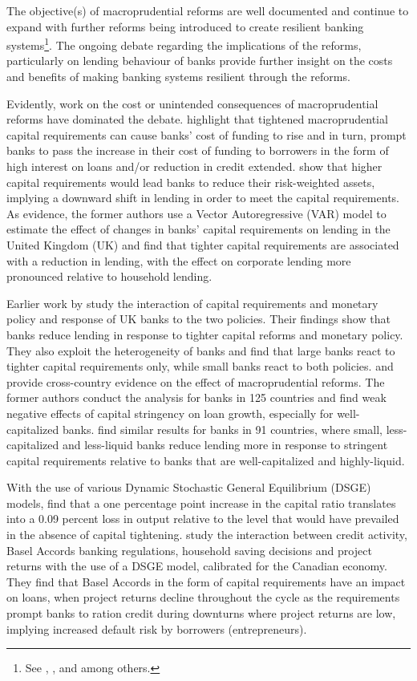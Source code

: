 \documentclass[
  letterpaper,
  DIV=11,
  numbers=noendperiod]{scrartcl}
\begin{document}
The objective(s) of macroprudential reforms are well documented and
continue to expand with further reforms being introduced to create
resilient banking
systems\footnote{See \cite{kashyap2004cyclical}, \cite{basel06}, \cite{cohen2016banks} and \cite{cerutti2018changes} among others.}.
The ongoing debate regarding the implications of the reforms,
particularly on lending behaviour of banks provide further insight on
the costs and benefits of making banking systems resilient through the
reforms.

Evidently, work on the cost or unintended consequences of
macroprudential reforms have dominated the debate.
\cite{noss2016estimating} highlight that tightened macroprudential
capital requirements can cause banks' cost of funding to rise and in
turn, prompt banks to pass the increase in their cost of funding to
borrowers in the form of high interest on loans and/or reduction in
credit extended. \cite{deli2017real} show that higher capital
requirements would lead banks to reduce their risk-weighted assets,
implying a downward shift in lending in order to meet the capital
requirements. As evidence, the former authors use a Vector
Autoregressive (VAR) model to estimate the effect of changes in banks'
capital requirements on lending in the United Kingdom (UK) and find that
tighter capital requirements are associated with a reduction in lending,
with the effect on corporate lending more pronounced relative to
household lending.

Earlier work by \cite{aiyar2016does} study the interaction of capital
requirements and monetary policy and response of UK banks to the two
policies. Their findings show that banks reduce lending in response to
tighter capital reforms and monetary policy. They also exploit the
heterogeneity of banks and find that large banks react to tighter
capital requirements only, while small banks react to both policies.
\cite{deli2017real} and \cite{mirzaei2022effectiveness} provide
cross-country evidence on the effect of macroprudential reforms. The
former authors conduct the analysis for banks in 125 countries and find
weak negative effects of capital stringency on loan growth, especially
for well-capitalized banks. \cite{mirzaei2022effectiveness} find similar
results for banks in 91 countries, where small, less-capitalized and
less-liquid banks reduce lending more in response to stringent capital
requirements relative to banks that are well-capitalized and
highly-liquid.

With the use of various Dynamic Stochastic General Equilibrium (DSGE)
models, \cite{angelini2015b} find that a one percentage point increase
in the capital ratio translates into a 0.09 percent loss in output
relative to the level that would have prevailed in the absence of
capital tightening. \cite{berka2018basel} study the interaction between
credit activity, Basel Accords banking regulations, household saving
decisions and project returns with the use of a DSGE model, calibrated
for the Canadian economy. They find that Basel Accords in the form of
capital requirements have an impact on loans, when project returns
decline throughout the cycle as the requirements prompt banks to ration
credit during downturns where project returns are low, implying
increased default risk by borrowers (entrepreneurs).
\end{document}
